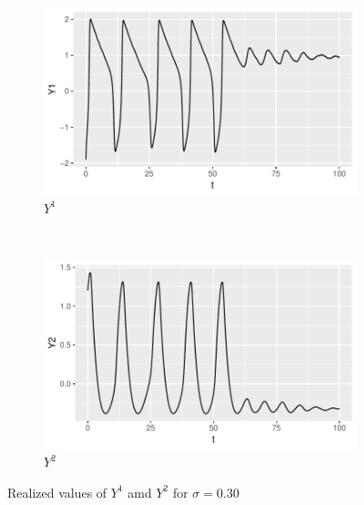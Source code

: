 \documentclass[a4paper]{article}
\begin{document}
\begin{figure}
    \centering
    \begin{subfigure}[b]{0.45\textwidth}
        \includegraphics[width=\textwidth]{part1a-sigma3-Y1.pdf}
        \caption{$Y^1$}
    \end{subfigure}
    ~
    \begin{subfigure}[b]{0.45\textwidth}
        \includegraphics[width=\textwidth]{part1a-sigma3-Y2.pdf}
        \caption{$Y^2$}
    \end{subfigure}
    \caption{Realized values of $Y^1$ amd $Y^2$ for $\sigma = 0.30$}\label{fig:part1a-sigma3}
\end{figure}
\end{document}
